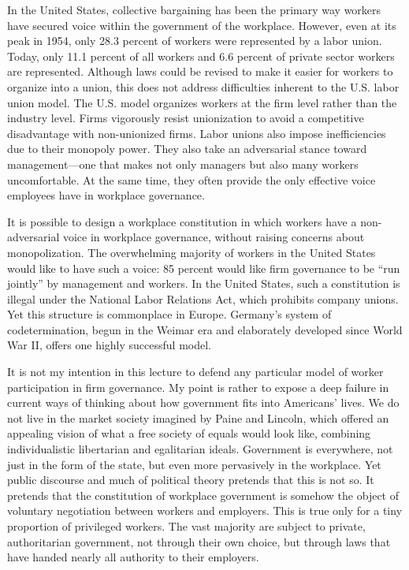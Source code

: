 \documentclass[
  letterpaper,
  11pt,
  DIV=9,
  openright]{scrbook}
\begin{document}
In the United States, collective bargaining has been the primary way
workers have secured voice within the government of the workplace.
However, even at its peak in 1954, only 28.3 percent of workers were
represented by a labor union. Today, only 11.1 percent of all workers
and 6.6 percent of private sector workers are represented. Although laws
could be revised to make it easier for workers to organize into a union,
this does not address difficulties inherent to the U.S. labor union
model. The U.S. model organizes workers at the firm level rather than
the industry level. Firms vigorously resist unionization to avoid a
competitive disadvantage with non-unionized firms. Labor unions also
impose inefficiencies due to their monopoly power. They also take an
adversarial stance toward management---one that makes not only managers
but also many workers uncomfortable. At the same time, they often
provide the only effective voice employees have in workplace governance.

It is possible to design a workplace constitution in which workers have
a non-adversarial voice in workplace governance, without raising
concerns about monopolization. The overwhelming majority of workers in
the United States would like to have such a voice: 85 percent would like
firm governance to be ``run jointly'' by management and workers. In the
United States, such a constitution is illegal under the National Labor
Relations Act, which prohibits company unions. Yet this structure is
commonplace in Europe. Germany's system of codetermination, begun in the
Weimar era and elaborately developed since World War II, offers one
highly successful model.

It is not my intention in this lecture to defend any particular model of
worker participation in firm governance. My point is rather to expose a
deep failure in current ways of thinking about how government fits into
Americans' lives. We do not live in the market society imagined by Paine
and Lincoln, which offered an appealing vision of what a free society of
equals would look like, combining individualistic libertarian and
egalitarian ideals. Government is everywhere, not just in the form of
the state, but even more pervasively in the workplace. Yet public
discourse and much of political theory pretends that this is not so. It
pretends that the constitution of workplace government is somehow the
object of voluntary negotiation between workers and employers. This is
true only for a tiny proportion of privileged workers. The vast majority
are subject to private, authoritarian government, not through their own
choice, but through laws that have handed nearly all authority to their
employers.
\end{document}
